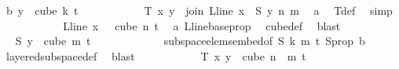 \begin{isabellebody}
\ b{\isacharcolon}{\kern0pt}\ {\isachardoublequoteopen}y\ {\isasymin}\ cube\ k\ {\isacharparenleft}{\kern0pt}t{\isacharplus}{\kern0pt}{}{\isacharparenright}{\kern0pt}{\isachardoublequoteclose}\isanewline
\ \ \ \ \ \ \ \ \isamarkupfalse%
\ \isamarkupfalse%
\ {\isachardoublequoteopen}T{\isacharprime}{\kern0pt}\ x\ y\ {\isacharequal}{\kern0pt}\ join\ {\isacharparenleft}{\kern0pt}L{\isacharunderscore}{\kern0pt}line\ {\isacharparenleft}{\kern0pt}x\ {}{\isacharparenright}{\kern0pt}{\isacharparenright}{\kern0pt}\ {\isacharparenleft}{\kern0pt}S\ y{\isacharparenright}{\kern0pt}\ n\ m{\isachardoublequoteclose}\ \isamarkupfalse%
\ a\ \isamarkupfalse%
\ T{\isacharprime}{\kern0pt}{\isacharunderscore}{\kern0pt}def\ \isamarkupfalse%
\ simp\isanewline
\ \ \ \ \ \ \ \ \isamarkupfalse%
\ \isamarkupfalse%
\ {\isachardoublequoteopen}L{\isacharunderscore}{\kern0pt}line\ {\isacharparenleft}{\kern0pt}x\ {}{\isacharparenright}{\kern0pt}\ {\isasymin}\ cube\ n\ {\isacharparenleft}{\kern0pt}t{\isacharplus}{\kern0pt}{}{\isacharparenright}{\kern0pt}{\isachardoublequoteclose}\ \isamarkupfalse%
\ a\ L{\isacharunderscore}{\kern0pt}line{\isacharunderscore}{\kern0pt}base{\isacharunderscore}{\kern0pt}prop\ \isamarkupfalse%
\ cube{\isacharunderscore}{\kern0pt}def\ \isamarkupfalse%
\ blast\isanewline
\ \ \ \ \ \ \ \ \isamarkupfalse%
\ \isamarkupfalse%
\ {\isachardoublequoteopen}S\ y\ {\isasymin}\ cube\ m\ {\isacharparenleft}{\kern0pt}t{\isacharplus}{\kern0pt}{}{\isacharparenright}{\kern0pt}{\isachardoublequoteclose}\ \isanewline
\ \ \ \ \ \ \ \ \ \ \isamarkupfalse%
\ subspace{\isacharunderscore}{\kern0pt}elems{\isacharunderscore}{\kern0pt}embed{\isacharbrackleft}{\kern0pt}of\ {\isachardoublequoteopen}S{\isachardoublequoteclose}\ {\isachardoublequoteopen}k{\isachardoublequoteclose}\ {\isachardoublequoteopen}m{\isachardoublequoteclose}\ {\isachardoublequoteopen}t{\isacharplus}{\kern0pt}{}{\isachardoublequoteclose}{\isacharbrackright}{\kern0pt}\ S{\isacharunderscore}{\kern0pt}prop\ b\ \isamarkupfalse%
\ layered{\isacharunderscore}{\kern0pt}subspace{\isacharunderscore}{\kern0pt}def\ \isamarkupfalse%
\ blast\isanewline
\ \ \ \ \ \ \ \ \isamarkupfalse%
\ \isamarkupfalse%
\ {\isachardoublequoteopen}T{\isacharprime}{\kern0pt}\ x\ y\ {\isasymin}\ cube\ {\isacharparenleft}{\kern0pt}n\ {\isacharplus}{\kern0pt}\ m{\isacharparenright}{\kern0pt}\ {\isacharparenleft}{\kern0pt}t\ {\isacharplus}{\kern0pt}\ {}{\isacharparenright}{\kern0pt}{\isachardoublequoteclose}\ \isamarkupfalse%

\end{isabellebody}
